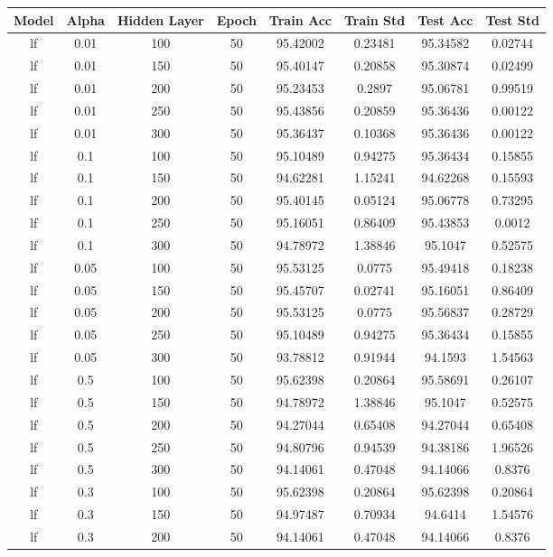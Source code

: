 \begin{table}[htbp]
\centering
\begin{tabular}{|c|c|c|c|c|c|c|c|}
\hline
Model & Alpha & Hidden Layer & Epoch & Train Acc & Train Std & Test Acc & Test Std \\
\hline
lf & 0.01 & 100 & 50 & 95.42002 & 0.23481 & 95.34582 & 0.02744 \\
lf & 0.01 & 150 & 50 & 95.40147 & 0.20858 & 95.30874 & 0.02499 \\
lf & 0.01 & 200 & 50 & 95.23453 & 0.2897 & 95.06781 & 0.99519 \\
lf & 0.01 & 250 & 50 & 95.43856 & 0.20859 & 95.36436 & 0.00122 \\
lf & 0.01 & 300 & 50 & 95.36437 & 0.10368 & 95.36436 & 0.00122 \\
lf & 0.1 & 100 & 50 & 95.10489 & 0.94275 & 95.36434 & 0.15855 \\
lf & 0.1 & 150 & 50 & 94.62281 & 1.15241 & 94.62268 & 0.15593 \\
lf & 0.1 & 200 & 50 & 95.40145 & 0.05124 & 95.06778 & 0.73295 \\
lf & 0.1 & 250 & 50 & 95.16051 & 0.86409 & 95.43853 & 0.0012 \\
lf & 0.1 & 300 & 50 & 94.78972 & 1.38846 & 95.1047 & 0.52575 \\
lf & 0.05 & 100 & 50 & 95.53125 & 0.0775 & 95.49418 & 0.18238 \\
lf & 0.05 & 150 & 50 & 95.45707 & 0.02741 & 95.16051 & 0.86409 \\
lf & 0.05 & 200 & 50 & 95.53125 & 0.0775 & 95.56837 & 0.28729 \\
lf & 0.05 & 250 & 50 & 95.10489 & 0.94275 & 95.36434 & 0.15855 \\
lf & 0.05 & 300 & 50 & 93.78812 & 0.91944 & 94.1593 & 1.54563 \\
lf & 0.5 & 100 & 50 & 95.62398 & 0.20864 & 95.58691 & 0.26107 \\
lf & 0.5 & 150 & 50 & 94.78972 & 1.38846 & 95.1047 & 0.52575 \\
lf & 0.5 & 200 & 50 & 94.27044 & 0.65408 & 94.27044 & 0.65408 \\
lf & 0.5 & 250 & 50 & 94.80796 & 0.94539 & 94.38186 & 1.96526 \\
lf & 0.5 & 300 & 50 & 94.14061 & 0.47048 & 94.14066 & 0.8376 \\
lf & 0.3 & 100 & 50 & 95.62398 & 0.20864 & 95.62398 & 0.20864 \\
lf & 0.3 & 150 & 50 & 94.97487 & 0.70934 & 94.6414 & 1.54576 \\
lf & 0.3 & 200 & 50 & 94.14061 & 0.47048 & 94.14066 & 0.8376 \\

\end{tabular}
\end{table}
